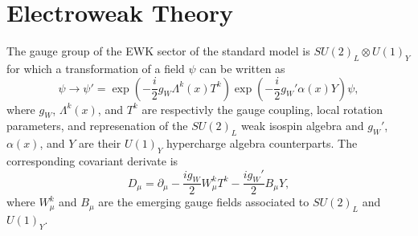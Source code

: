   \section{Electroweak Theory}

    The gauge group of the EWK sector of the standard model is $ SU(2)_L \otimes U(1)_Y $ for which a transformation of a field $ \psi $ can be written as
    \begin{equation}
      \psi \rightarrow \psi' = \exp\left(- \frac{i}{2} g_W \Lambda^k(x) T^k \right) \exp\left(- \frac{i}{2} g_W' \alpha(x) Y \right) \psi ,
    \end{equation}
    where $ g_W $, $ \Lambda^k(x) $, and $ T^k $ are respectivly the gauge coupling, local rotation parameters, and represenation of the $ SU(2)_L $ weak isospin algebra and $ g_W' $, $ \alpha(x) $, and $ Y $ are their $ U(1)_Y $ hypercharge algebra counterparts. The corresponding covariant derivate is
    \begin{equation}
      D_\mu = \partial_\mu - \frac{i g_W}{2} W^k_\mu T^k - \frac{i g_W'}{2} B_\mu Y ,
    \end{equation}
    where $ W^k_\mu $ and $ B_\mu$ are the emerging gauge fields associated to $ SU(2)_L $ and $ U(1)_Y $. \\

